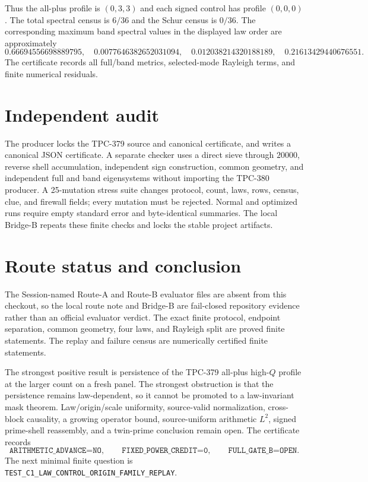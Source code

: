 \documentclass[10pt]{article}
\begin{document}
Thus the all-plus profile is $(0,3,3)$ and each signed control has profile
$(0,0,0)$.  The total spectral census is $6/36$ and the Schur census is
$0/36$.  The corresponding maximum band spectral values in the displayed
law order are approximately
\[
0.66694556698889795,\quad 0.0077646382652031094,\quad
0.012038214320188189,\quad 0.21613429440676551.
\]
The certificate records all full/band metrics, selected-mode Rayleigh terms,
and finite numerical residuals.

\section{Independent audit}

The producer locks the TPC-379 source and canonical certificate, and writes a
canonical JSON certificate.  A separate checker uses a direct sieve through
$20000$, reverse shell accumulation, independent sign construction, common
geometry, and independent full and band eigensystems without importing the
TPC-380 producer.  A 25-mutation stress suite changes protocol, count, laws,
rows, census, clue, and firewall fields; every mutation must be rejected.
Normal and optimized runs require empty standard error and byte-identical
summaries.  The local Bridge-B repeats these finite checks and locks the
stable project artifacts.

\section{Route status and conclusion}

The Session-named Route-A and Route-B evaluator files are absent from this
checkout, so the local route note and Bridge-B are fail-closed repository
evidence rather than an official evaluator verdict.  The exact finite
protocol, endpoint separation, common geometry, four laws, and Rayleigh split
are proved finite statements.  The replay and failure census are numerically
certified finite statements.

The strongest positive result is persistence of the TPC-379 all-plus
high-$Q$ profile at the larger count on a fresh panel.  The strongest
obstruction is that the persistence remains law-dependent, so it cannot be
promoted to a law-invariant mask theorem.  Law/origin/scale uniformity,
source-valid normalization, cross-block causality, a growing operator bound,
source-uniform arithmetic $L^2$, signed prime-shell reassembly, and a
twin-prime conclusion remain open.  The certificate records
\[
\texttt{ARITHMETIC\_ADVANCE=NO},\qquad
\texttt{FIXED\_POWER\_CREDIT=0},\qquad
\texttt{FULL\_GATE\_B=OPEN}.
\]
The next minimal finite question is
\texttt{TEST\_C1\_LAW\_CONTROL\_ORIGIN\_FAMILY\_REPLAY}.
\end{document}
